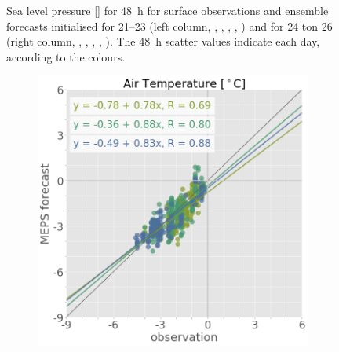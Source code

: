 \begin{figure}[t!]
\begin{subfigure}[b]{0.49\textwidth}
	\end{subfigure}
	\caption{Sea level pressure [\SI{}{\hPa}] for \SI{48}{\hour} for surface observations and ensemble forecasts initialised for \SIrange{21}{23}{\dec} (left column, \protect{}, \protect{}, \protect{}, \protect{}, \protect{}) and  for \num{24} ton \SI{26}{\dec} (right column, \protect{}, \protect{}, \protect{}, \protect{}, \protect{}). The \SI{48}{\hour} scatter values indicate each day, according to the colours.  }\label{fig:scat:obs_meps}
\end{figure}
\begin{figure}\ContinuedFloat
	\centering
	\begin{subfigure}[b]{0.49\textwidth}
		\includegraphics[trim={0.cm 0cm 12.5cm 0cm},clip,
		width=\textwidth]{./fig_sfc_temp/obs_model_20161221_23_00}
		\caption{}\label{fig:scat:temp2123}
	\end{subfigure}
	\begin{subfigure}[b]{0.49\textwidth}

\end{subfigure}
\end{figure}
